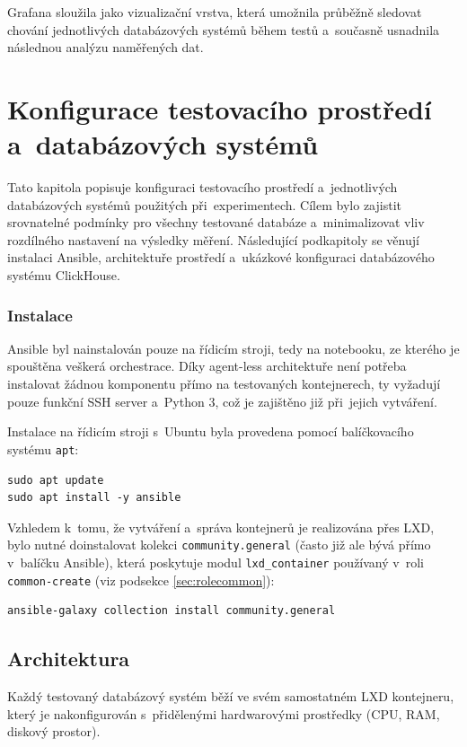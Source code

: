 Grafana sloužila jako vizualizační vrstva, která umožnila průběžně sledovat chování jednotlivých databázových systémů během testů a~současně usnadnila následnou analýzu naměřených dat. 

\section{Konfigurace testovacího prostředí a~databázových systémů}

Tato kapitola popisuje konfiguraci testovacího prostředí a~jednotlivých databázových systémů použitých při~experimentech. 
Cílem bylo zajistit srovnatelné podmínky pro všechny testované databáze a~minimalizovat vliv rozdílného nastavení na výsledky měření. 
Následující podkapitoly se věnují instalaci Ansible, architektuře prostředí a~ukázkové konfiguraci databázového systému ClickHouse.

\subsubsection{Instalace}
Ansible byl nainstalován pouze na řídicím stroji, tedy na notebooku, ze kterého je spouštěna veškerá orchestrace. 
Díky agent-less architektuře není potřeba instalovat žádnou komponentu přímo na testovaných kontejnerech, ty vyžadují pouze funkční SSH server a~Python 3, což je zajištěno již při~jejich vytváření.

Instalace na řídicím stroji s~Ubuntu byla provedena pomocí balíčkovacího systému \texttt{apt}:

\begin{lstlisting}[caption={Instalace Ansible}, label={lst:ansibleinstall}, captionpos=b]
sudo apt update
sudo apt install -y ansible
\end{lstlisting}

Vzhledem k~tomu, že vytváření a~správa kontejnerů je realizována přes LXD, bylo nutné doinstalovat kolekci \texttt{community.general} (často již ale bývá přímo v~balíčku Ansible), která poskytuje modul \texttt{lxd\_container} používaný v~roli \texttt{common-create} (viz podsekce \ref{sec:rolecommon}):

\begin{lstlisting}[caption={Instalace kolekce community.general}, label={lst:communitygeneral}, captionpos=b]
ansible-galaxy collection install community.general
\end{lstlisting}

\subsection{Architektura}
Každý testovaný databázový systém běží ve svém samostatném LXD kontejneru, který je nakonfigurován s~přidělenými hardwarovými prostředky (CPU, RAM, diskový prostor).

